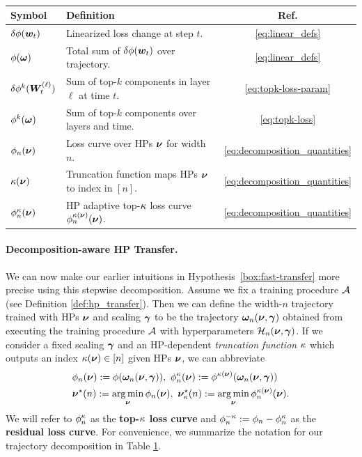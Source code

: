 \begin{table}[t]
\vspace{-4mm}
    \centering
    \caption{}
    \vspace{-2mm}
    \label{tab:phi_notation}
    \small
    \begin{tabular}{@{}llc@{}}
        \toprule
        \textbf{Symbol} & \textbf{Definition} & \textbf{Ref.} \\
        \midrule
        $\delta \phi({\boldsymbol w}_t)$ & Linearized loss change at step $t$. & \eqref{eq:linear_defs} \\
        $\phi(\bm{\omega})$ & Total sum of $\delta \phi({\boldsymbol w}_t)$ over trajectory. & \eqref{eq:linear_defs} \\
        $\delta \phi^k({\boldsymbol W}^{(\ell)}_t)$ & Sum of top-$k$ components in layer $\ell$ at time $t$. & \eqref{eq:topk-loss-param} \\
        $\phi^k(\bm{\omega})$ & Sum of top-$k$ components over layers and time. & \eqref{eq:topk-loss} \\
        \midrule
        $\phi_n(\bm{\nu})$ & Loss curve over HPs $\bm{\nu}$ for width $n$. & \eqref{eq:decomposition_quantities} \\
        $\kappa(\bm{\nu})$ & Truncation function maps HPs $\bm{\nu}$ to index in $[n]$. & \eqref{eq:decomposition_quantities} \\
        $\phi_n^\kappa(\bm{\nu})$ & HP adaptive top-$\kappa$ loss curve $\phi_n^{\kappa(\bm{\nu})}(\bm{\nu})$. & \eqref{eq:decomposition_quantities} \\
        \bottomrule
    \end{tabular}
\end{table}


\paragraph{Decomposition-aware HP Transfer.}
We can now make our earlier intuitions in Hypothesis~\ref{box:fast-transfer} more precise using this stepwise decomposition. Assume we fix a training procedure $\mathcal{A}$ (see Definition \ref{def:hp_transfer}).
Then we can define the width-$n$ trajectory trained with HPs $\bm{\nu}$ and scaling $\bm{\gamma}$ to be the trajectory $\bm{\omega}_n(\bm{\nu}, \bm{\gamma})$ obtained from executing the training procedure $\mathcal{A}$ with hyperparameters $\mathcal{H}_n(\bm{\nu}, \bm{\gamma})$. If we consider a fixed scaling $\bm{\gamma}$ and an HP-dependent \emph{truncation function} $\kappa$ which outputs an index $\kappa(\bm{\nu}) \in [n]$ given HPs $\bm{\nu}$, we can abbreviate 
\begin{align}\label{eq:decomposition_quantities}
    &\phi_n(\bm{\nu}) := \phi(\bm{\omega}_n(\bm{\nu}, \bm{\gamma})),~  \phi_n^\kappa(\bm{\nu}) := \phi^{\kappa(\bm{\nu})}(\bm{\omega}_n(\bm{\nu}, \bm{\gamma})) \notag \\
    &\bm{\nu}^\star(n) := \operatorname*{arg\,min}_{\bm{\nu}} \phi_n(\bm{\nu}),~  \bm{\nu}_\kappa^\star(n) := \operatorname*{arg\,min}_{\bm{\nu}} \phi^{\kappa(\bm{\nu})}_n(\bm{\nu}).
\end{align}
We will refer to $\phi_n^\kappa$ as the \textbf{top-$\kappa$ loss curve} and $\phi_n^{-\kappa} := \phi_n - \phi_n^\kappa$ as the \textbf{residual loss curve}. For
convenience, we summarize the notation for our trajectory decomposition in Table \ref{tab:phi_notation}.

